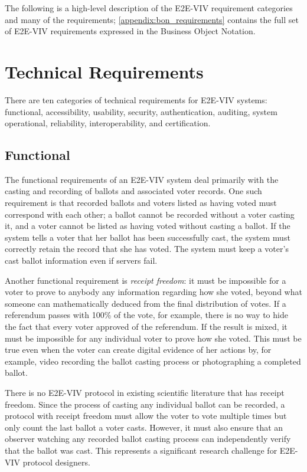 The following is a high-level description of the E2E-VIV requirement
categories and many of the requirements;
\autoref{appendix:bon_requirements} contains the full set of E2E-VIV
requirements expressed in the Business Object Notation.

\section{Technical Requirements}
There are ten categories of technical requirements for E2E-VIV
systems: functional, accessibility, usability, security,
authentication, auditing, system operational, reliability,
interoperability, and certification. 

\subsection{Functional} 
\label{sec:functional}

The functional requirements of an E2E-VIV system deal primarily with
the casting and recording of ballots and associated voter records. One
such requirement is that recorded ballots and voters listed as having
voted must correspond with each other; a ballot cannot be recorded
without a voter casting it, and a voter cannot be listed as having
voted without casting a ballot. If the system tells a voter that her
ballot has been successfully cast, the system must correctly retain
the record that she has voted. The system must keep a voter's cast
ballot information even if servers fail.

Another functional requirement is \emph{receipt freedom}: it must be
impossible for a voter to prove to anybody any information regarding
how she voted, beyond what someone can mathematically deduced from the
final distribution of votes. If a referendum passes with 100\% of the
vote, for example, there is no way to hide the fact that every voter
approved of the referendum. If the result is mixed, it must be
impossible for any individual voter to prove how she voted.  This must
be true even when the voter can create digital evidence of her actions
by, for example, video recording the ballot casting process or
photographing a completed ballot. 

There is no E2E-VIV protocol in existing scientific literature that
has receipt freedom. Since the process of casting any individual
ballot can be recorded, a protocol with receipt freedom must allow the
voter to vote multiple times but only count the last ballot a voter
casts. However, it must also ensure that an observer watching any
recorded ballot casting process can independently verify that the
ballot was cast. This represents a significant research challenge for
E2E-VIV protocol designers.

